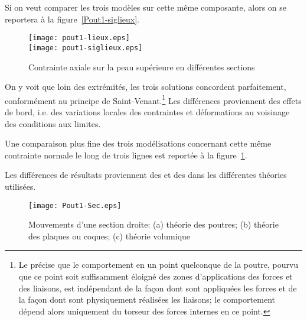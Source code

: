 \medskip
Si on veut comparer les trois modèles sur cette même composante, alors on se reportera à la figure~\ref{Pout1-siglieux}.
\begin{figure}[ht]
\centering
\texttt{[image: pout1-lieux.eps]}\\
\texttt{[image: pout1-siglieux.eps]}
\caption{Contrainte axiale sur la peau supérieure en différentes sections}
\end{figure}\label{Pout1-siglieux}
On y voit que loin des extrémités, les trois solutions concordent parfaitement, conformément au principe de Saint-Venant.\footnote{Le  précise que le comportement en un point quelconque de la poutre, pourvu que ce point soit suffisamment éloigné des zones d'applications des forces et des liaisons, est indépendant de la façon dont sont appliquées les forces et de la façon dont sont physiquement réalisées les liaisons; le comportement dépend alors uniquement du torseur des forces internes en ce point.} Les différences proviennent des effets de bord, i.e. des variations locales des contraintes et déformations au voisinage des conditions aux limites.

Une comparaison plus fine des trois modélisations concernant cette même contrainte normale le long de trois lignes est reportée à la figure~\ref{Pout1-sec}.

\medskip
Les différences de résultats proviennent des  et des  dans les différentes théories utilisées.
\begin{figure}[ht]
\centering
\texttt{[image: Pout1-Sec.eps]}
\caption{Mouvements d'une section droite: (a) théorie des poutres;
(b) théorie des plaques ou coques; (c) théorie volumique}\label{Pout1-sec}
\end{figure}

